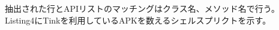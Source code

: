 抽出された行とAPIリストのマッチングはクラス名、メソッド名で行う。
Listing4にTinkを利用しているAPKを数えるシェルスプリクトを示す。%



































